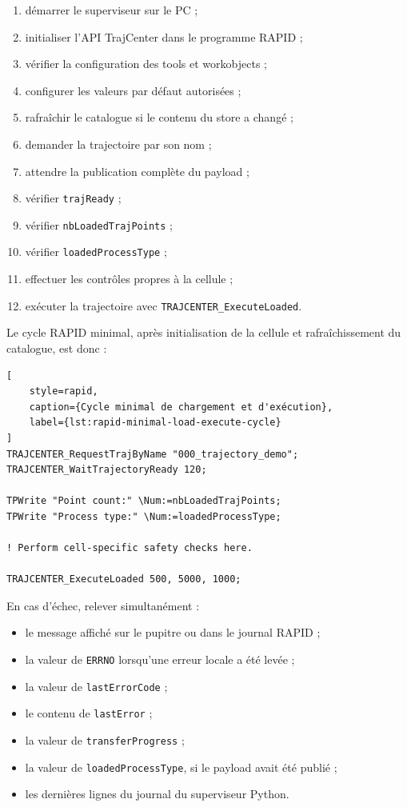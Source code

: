 \documentclass{rapportENSAM}
\begin{document}
\begin{enumerate}
    \item démarrer le superviseur sur le PC ;
    \item initialiser l'API TrajCenter dans le programme RAPID ;
    \item vérifier la configuration des tools et workobjects ;
    \item configurer les valeurs par défaut autorisées ;
    \item rafraîchir le catalogue si le contenu du store a changé ;
    \item demander la trajectoire par son nom ;
    \item attendre la publication complète du payload ;
    \item vérifier \texttt{trajReady} ;
    \item vérifier \texttt{nbLoadedTrajPoints} ;
    \item vérifier \texttt{loadedProcessType} ;
    \item effectuer les contrôles propres à la cellule ;
    \item exécuter la trajectoire avec
    \texttt{TRAJCENTER\_ExecuteLoaded}.
\end{enumerate}

Le cycle RAPID minimal, après initialisation de la cellule et rafraîchissement
du catalogue, est donc :

\begin{lstlisting}[
    style=rapid,
    caption={Cycle minimal de chargement et d'exécution},
    label={lst:rapid-minimal-load-execute-cycle}
]
TRAJCENTER_RequestTrajByName "000_trajectory_demo";
TRAJCENTER_WaitTrajectoryReady 120;

TPWrite "Point count:" \Num:=nbLoadedTrajPoints;
TPWrite "Process type:" \Num:=loadedProcessType;

! Perform cell-specific safety checks here.

TRAJCENTER_ExecuteLoaded 500, 5000, 1000;
\end{lstlisting}

En cas d'échec, relever simultanément :

\begin{itemize}
    \item le message affiché sur le pupitre ou dans le journal RAPID ;
    \item la valeur de \texttt{ERRNO} lorsqu'une erreur locale a été levée ;
    \item la valeur de \texttt{lastErrorCode} ;
    \item le contenu de \texttt{lastError} ;
    \item la valeur de \texttt{transferProgress} ;
    \item la valeur de \texttt{loadedProcessType}, si le payload avait été
    publié ;
    \item les dernières lignes du journal du superviseur Python.
\end{itemize}
\end{document}
